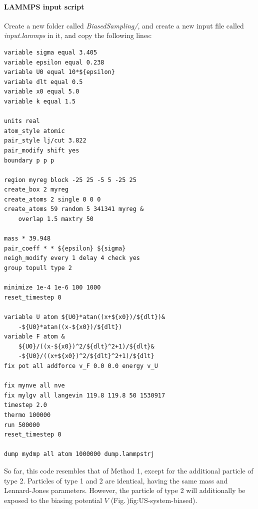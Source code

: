 \documentclass[9pt,tutorial]{livecoms}
\begin{document}
\paragraph{LAMMPS input script}
Create a new folder called \textit{BiasedSampling/}, and create a new input file called \textit{input.lammps} in it, and copy the following lines:
{\normalsize \begin{verbatim}
variable sigma equal 3.405
variable epsilon equal 0.238
variable U0 equal 10*${epsilon}
variable dlt equal 0.5
variable x0 equal 5.0
variable k equal 1.5

units real
atom_style atomic
pair_style lj/cut 3.822
pair_modify shift yes
boundary p p p

region myreg block -25 25 -5 5 -25 25
create_box 2 myreg
create_atoms 2 single 0 0 0
create_atoms 59 random 5 341341 myreg &
    overlap 1.5 maxtry 50

mass * 39.948
pair_coeff * * ${epsilon} ${sigma}
neigh_modify every 1 delay 4 check yes
group topull type 2

minimize 1e-4 1e-6 100 1000
reset_timestep 0

variable U atom ${U0}*atan((x+${x0})/${dlt})&
    -${U0}*atan((x-${x0})/${dlt})
variable F atom &
    ${U0}/((x-${x0})^2/${dlt}^2+1)/${dlt}&
    -${U0}/((x+${x0})^2/${dlt}^2+1)/${dlt}
fix pot all addforce v_F 0.0 0.0 energy v_U

fix mynve all nve
fix mylgv all langevin 119.8 119.8 50 1530917
timestep 2.0
thermo 100000
run 500000
reset_timestep 0

dump mydmp all atom 1000000 dump.lammpstrj
\end{verbatim}}
So far, this code resembles that of Method 1, except for the additional particle of type 2. Particles of type 1 and 2
are identical, having the same mass and Lennard-Jones parameters. However, the particle of type 2 will additionally be exposed to the biasing potential $V$ (Fig.\,){fig:US-system-biased}).
\end{document}
